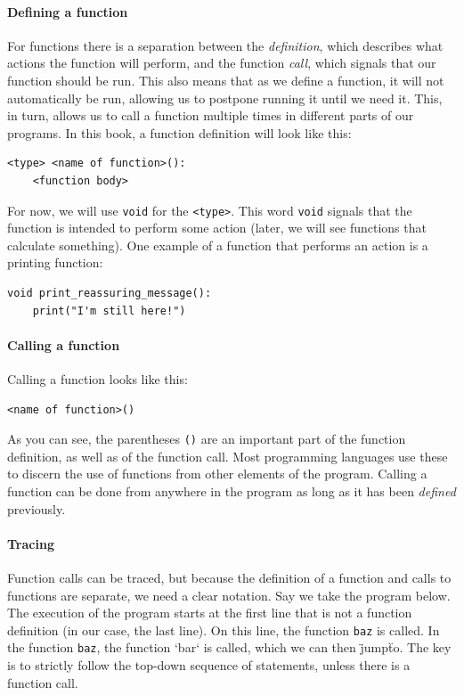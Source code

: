 \paragraph{Defining a function}

For functions there is a separation between the \emph{definition}, which describes what actions the function will perform, and the function \emph{call}, which signals that our function should be run. This also means that as we define a function, it will not automatically be run, allowing us to postpone running it until we need it. This, in turn, allows us to call a function multiple times in different parts of our programs. In this book, a function definition will look like this:

\begin{verbatim}
<type> <name of function>():
    <function body>
\end{verbatim}

For now, we will use \texttt{void} for the \texttt{<type>}. This word \texttt{void} signals that the function is intended to perform some action (later, we will see functions that calculate something). One example of a function that performs an action is a printing function:

\begin{verbatim}
void print_reassuring_message():
    print("I'm still here!")
\end{verbatim}

\paragraph{Calling a function}

Calling a function looks like this:

\begin{verbatim}
<name of function>()
\end{verbatim}

As you can see, the parentheses \texttt{()} are an important part of the function definition, as well as of the function call. Most programming languages use these to discern the use of functions from other elements of the program. Calling a function can be done from anywhere in the program as long as it has been \emph{defined} previously.


\paragraph{Tracing} Function calls can be traced, but because the definition of a function and calls to functions are separate, we need a clear notation. Say we take the program below. The execution of the program starts at the first line that is not a function definition (in our case, the last line). On this line, the function \texttt{baz} is called. In the function \texttt{baz}, the function `bar` is called, which we can then \"jump\" to. The key is to strictly follow the top-down sequence of statements, unless there is a function call.

